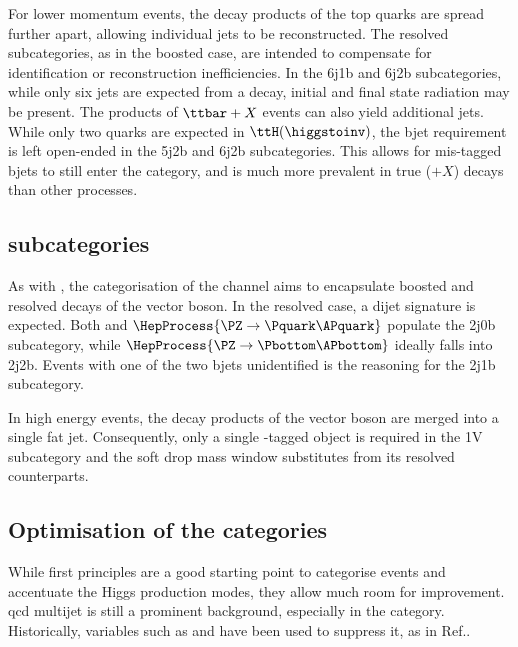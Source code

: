 For lower momentum events, the decay products of the top quarks are spread further apart, allowing individual \glspl{jet} to be reconstructed. The \ttH resolved subcategories, as in the boosted case, are intended to compensate for identification or reconstruction inefficiencies. In the 6j1b and 6j2b subcategories, while only six \glspl{jet} are expected from a \ttbar decay, initial and final state radiation may be present. The products of $\ttbar + X$ events can also yield additional jets. While only two \Pbottom quarks are expected in $\ttH(\higgstoinv)$, the \gls{bjet} requirement is left open-ended in the 5j2b and 6j2b subcategories. This allows for mis-tagged \glspl{bjet} to still enter the category, and is much more prevalent in true \ttbar ($+ X$) decays than other processes.




\subsection{\texorpdfstring{\VH}{VH} subcategories}
\label{subsec:htoinv_VH_subcats}

As with \ttH, the categorisation of the \VH channel aims to encapsulate boosted and resolved decays of the vector boson. In the resolved case, a dijet signature is expected. Both \PW and $\HepProcess{\PZ \to \Pquark\APquark}$ populate the 2j0b subcategory, while $\HepProcess{\PZ \to \Pbottom\APbottom}$ ideally falls into 2j2b. Events with one of the two \glspl{bjet} unidentified is the reasoning for the 2j1b subcategory.

In high energy events, the decay products of the vector boson are merged into a single fat jet. Consequently, only a single \PVec-tagged object is required in the 1V subcategory and the soft drop mass window substitutes \mjj from its resolved counterparts.




\subsection{Optimisation of the categories}
\label{subsec:htoinv_cat_optimisation}

While first principles are a good starting point to categorise events and accentuate the Higgs production modes, they allow much room for improvement. \acrshort{qcd} multijet is still a prominent background, especially in the \ttH category. Historically, variables such as \biasedDPhi and \alphat have been used to suppress it, as in Ref..


